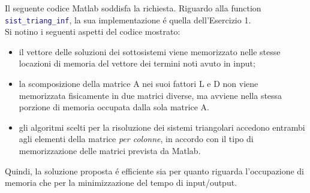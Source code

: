 \begin{center}
\footnotesize\noindent{}\end{center}

\noindent Il seguente codice Matlab soddisfa la richiesta. Riguardo alla function \lstinline[language=Matlab]{sist_triang_inf}, la sua implementazione \'e quella dell'Esercizio 1.
\\


\noindent Si notino i seguenti aspetti del codice mostrato:
\begin{itemize}

\item il vettore delle soluzioni dei sottosistemi viene memorizzato nelle stesse locazioni di memoria del vettore dei termini noti avuto in input;
\item la scomposizione della matrice A nei suoi fattori L e D non viene memorizzata fisicamente in due matrici diverse, ma avviene nella stessa porzione di memoria occupata dalla sola matrice A.
\item gli algoritmi scelti per la risoluzione dei sistemi triangolari accedono entrambi agli elementi della matrice \textit{per colonne}, in accordo con il tipo di memorizzazione delle matrici prevista da Matlab.
\end{itemize}

\noindent Quindi, la soluzione proposta \'e efficiente sia per quanto riguarda l'occupazione di memoria che per la minimizzazione del tempo di input/output.
